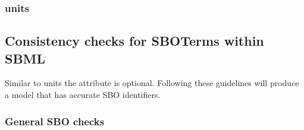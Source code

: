 \subsubsection*{ units} \begin{sbmlenum}


\end{sbmlenum}

\subsection{Consistency checks for SBOTerms within SBML}

Similar to units the  attribute is optional.  Following these
guidelines will produce a model that has accurate SBO identifiers.

\subsubsection*{General SBO checks} \begin{sbmlenum}


\end{sbmlenum}
